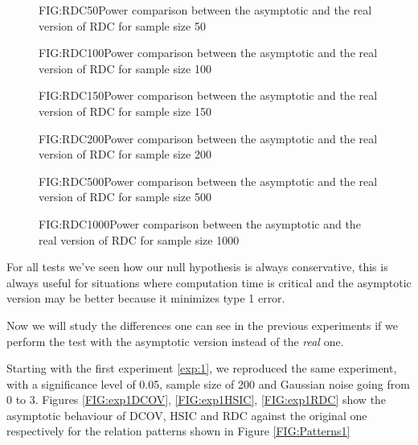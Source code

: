 \begin{figure}[RDC asymptotic size 50]{FIG:RDC50}{Power comparison between the asymptotic and the real version of RDC for sample size 50}
\end{figure}
\begin{figure}[RDC asymptotic size 100]{FIG:RDC100}{Power comparison between the asymptotic and the real version of RDC for sample size 100}
\end{figure}
\begin{figure}[RDC asymptotic size 150]{FIG:RDC150}{Power comparison between the asymptotic and the real version of RDC for sample size 150}
\end{figure}
\begin{figure}[RDC asymptotic size 200]{FIG:RDC200}{Power comparison between the asymptotic and the real version of RDC for sample size 200}
\end{figure}
\begin{figure}[RDC asymptotic size 500]{FIG:RDC500}{Power comparison between the asymptotic and the real version of RDC for sample size 500}
\end{figure}
\begin{figure}[RDC asymptotic size 1000]{FIG:RDC1000}{Power comparison between the asymptotic and the real version of RDC for sample size 1000}
\end{figure}

For all tests we've seen how our null hypothesis is always conservative, this is always useful for situations where computation time is critical and the asymptotic version may be better because it minimizes type 1 error.

Now we will study the differences one can see in the previous experiments if we perform the test with the asymptotic version instead of the \textit{real} one.

Starting with the first experiment \ref{exp:1}, we reproduced the same experiment, with a significance level of 0.05, sample size of 200 and Gaussian noise going from 0 to 3. Figures \ref{FIG:exp1DCOV}, \ref{FIG:exp1HSIC}, \ref{FIG:exp1RDC} show the asymptotic behaviour of DCOV, HSIC and RDC against the original one respectively for the relation patterns shown in Figure \ref{FIG:Patterns1}

